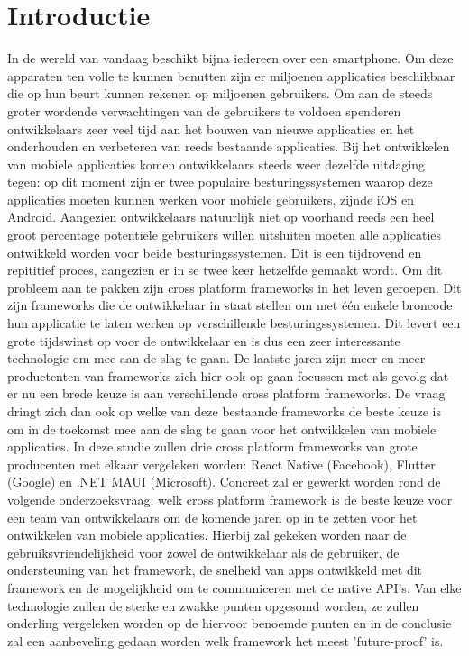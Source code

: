 
\section{Introductie} %
\label{sec:introductie}

In de wereld van vandaag beschikt bijna iedereen over een smartphone. Om deze apparaten ten volle te kunnen benutten zijn er miljoenen applicaties beschikbaar die op hun beurt kunnen rekenen op miljoenen gebruikers. Om aan de steeds groter wordende verwachtingen van de gebruikers te voldoen spenderen ontwikkelaars zeer veel tijd aan het bouwen van nieuwe applicaties en het onderhouden en verbeteren van reeds bestaande applicaties. Bij het ontwikkelen van mobiele applicaties komen ontwikkelaars steeds weer dezelfde uitdaging tegen: op dit moment zijn er twee populaire besturingssystemen waarop deze applicaties moeten kunnen werken voor mobiele gebruikers, zijnde iOS en Android. Aangezien ontwikkelaars natuurlijk niet op voorhand reeds een heel groot percentage potentiële gebruikers willen uitsluiten moeten alle applicaties ontwikkeld worden voor beide besturingssystemen. Dit is een tijdrovend en repititief proces, aangezien er in se twee keer hetzelfde gemaakt wordt. Om dit probleem aan te pakken zijn cross platform frameworks in het leven geroepen. Dit zijn frameworks die de ontwikkelaar in staat stellen om met één enkele broncode hun applicatie te laten werken op verschillende besturingssystemen. Dit levert een grote tijdswinst op voor de ontwikkelaar en is dus een zeer interessante technologie om mee aan de slag te gaan. De laatste jaren zijn meer en meer productenten van frameworks zich hier ook op gaan focussen met als gevolg dat er nu een brede keuze is aan verschillende cross platform frameworks. De vraag dringt zich dan ook op welke van deze bestaande frameworks de beste keuze is om in de toekomst mee aan de slag te gaan voor het ontwikkelen van mobiele applicaties. In deze studie zullen drie cross platform frameworks van grote producenten met elkaar vergeleken worden: React Native (Facebook), Flutter (Google) en .NET MAUI (Microsoft). Concreet zal er gewerkt worden rond de volgende onderzoeksvraag: welk cross platform framework is de beste keuze voor een team van ontwikkelaars om de komende jaren op in te zetten voor het ontwikkelen van mobiele applicaties. Hierbij zal gekeken worden naar de gebruiksvriendelijkheid voor zowel de ontwikkelaar als de gebruiker, de ondersteuning van het framework, de snelheid van apps ontwikkeld met dit framework en de mogelijkheid om te communiceren met de native API's. Van elke technologie zullen de sterke en zwakke punten opgesomd worden, ze zullen onderling vergeleken worden op de hiervoor benoemde punten en in de conclusie zal een aanbeveling gedaan worden welk framework het meest 'future-proof' is. 

